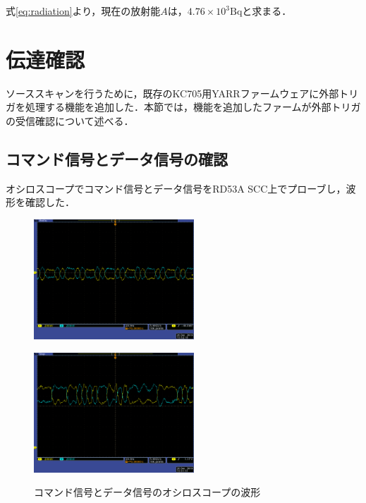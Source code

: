 式\ref{eq:radiation}より，現在の放射能$A$は，$4.76 \times 10^3 \mathrm{Bq}$と求まる．
  




\section{伝達確認}
\label{sec:scans}
ソーススキャンを行うために，既存のKC705用YARRファームウェアに外部トリガを処理する機能を追加した．本節では，機能を追加したファームが外部トリガの受信確認について述べる．

\subsection{コマンド信号とデータ信号の確認}
オシロスコープでコマンド信号とデータ信号をRD53A SCC上でプローブし，波形を確認した．

\begin{figure}[h]
  \centering
  \begin{minipage}[b]{0.45\linewidth}
    \centering
    \includegraphics[width=6cm]{./figure/CMDLine.png}
    \label{fig:cmd}
  \end{minipage}
  \begin{minipage}[b]{0.45\linewidth}
    \centering
    \includegraphics[width=6cm]{./figure/DataLine.png}
    \label{fig:gtx}
  \end{minipage}
  \caption{コマンド信号とデータ信号のオシロスコープの波形}
\end{figure}

